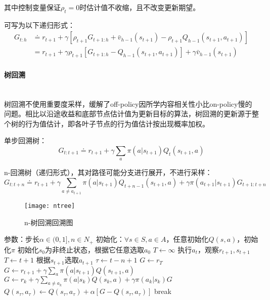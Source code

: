 \documentclass[
12pt, %
a4paper, 
oneside, %
headinclude,footinclude, %
]{scrartcl}
\begin{document}
其中控制变量保证$ \rho_t = 0 $时估计值不收缩，且不改变更新期望。

可写为以下递归形式：
\begin{align*}
G_{t:h} 
&\doteq r_{t + 1} + \gamma[\rho_{t + 1} G_{t + 1:h} + \bar{v}_{h - 1}(s_{t + 1}) - \rho_{t + 1} Q_{h - 1}(s_{t + 1}, a_{t + 1})] \\
&= r_{t + 1} + \gamma \rho_{t + 1}[G_{t + 1:h} - Q_{h - 1}(s_{t + 1}, a_{t + 1})] + \gamma \bar{v}_{h - 1}(s_{t + 1})
\end{align*}
\paragraph{树回溯}~\\

树回溯不使用重要度采样，缓解了off-policy因所学内容相关性小比on-policy慢的问题。相比以沿途收益和底部节点估计值为更新目标的算法，树回溯的更新源于整个树的行为值估计，即各叶子节点的行为值估计按出现概率加权。

单步回溯树：
$$ G_{t:t + 1} \doteq r_{t + 1} + \gamma \sum_{a} \pi(a|s_{t + 1}) Q_t(s_{t + 1}, a) $$

n-回溯树（递归形式），其对路径可能分支进行展开，不进行采样：
$$ G_{t:t + n} \doteq r_{t + 1} + \gamma \sum_{a \neq a_{t + 1}} \pi(a|s_{t + 1}) Q_{t + n - 1}(s_{t + 1}, a) + \gamma \pi(a_{t + 1}|s_{t + 1}) G_{t + 1:t + n} $$

\begin{figure}[H]
\centering
\texttt{[image: ntree]}
\caption{n-树回溯回溯图}
\end{figure}
\begin{myalgorithm}[n-树回溯]
\State 参数：步长$ \alpha \in (0,1], n \in N_+ $
\State 初始化：$ \forall s \in S, a \in A $，任意初始化$ Q(s, a) $，初始化$ \pi $
\State 初始化$ s_0 $为非终止状态，根据它任意选取$ a_0 $
\State $ T \gets \infty $
\State 执行$ a_t $，观察$ r_{t + 1}, s_{t + 1} $
\State $ T \gets t + 1 $
\Else
\State 根据$ s_{t + 1} $选取$ a_{t + 1} $
\EndIf
\EndIf
\State $ \tau \gets t - n + 1 $ 
\State $ G \gets r_T $ 
\Else
\State $ G \gets r_{t + 1} + \gamma \sum_a \pi(a|s_{t + 1})Q(s_{t + 1}, a) $
\EndIf
{}
\State $ G \gets r_k + \gamma \sum_{a \neq a_k} \pi(a|s_k)Q(s_k,a) + \gamma \pi(a_k|s_k)G $
\EndFor
\State $ Q(s_{\tau}, a_{\tau}) \gets Q(s_{\tau}, a_{\tau}) + \alpha[G - Q(s_{\tau}, a_{\tau})] $
\EndIf
{}
\State break
\EndIf
\EndFor
\EndFor
\end{myalgorithm}
\end{document}
